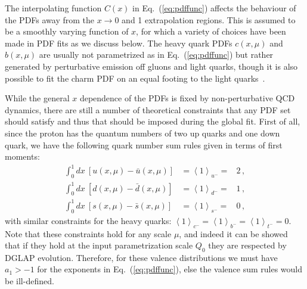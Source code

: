 The interpolating function $C(x)$ in
Eq.~(\ref{eq:pdffunc})
affects the behaviour of the PDFs away from the $x\to 0$ and 1
extrapolation regions.
%
This is assumed to be a smoothly varying function of $x$, for which a variety of choices have been made in PDF fits as we discuss below.
%
The heavy quark PDFs $c(x,\mu)$ and $b(x,\mu)$ are usually not
parametrized as in  Eq.~(\ref{eq:pdffunc}) but rather
generated by perturbative emission off gluons and light quarks,
though it is also possible to fit the charm PDF on an equal footing
to the light quarks~\cite{Ball:2016neh}.

While the general $x$ dependence of the PDFs is fixed by
non-perturbative QCD dynamics, there are still a number
of theoretical constraints that any PDF set should satisfy and thus that
should be imposed during the global fit.
%
First of all, since
the proton has the quantum numbers of two up quarks and one down quark,
we have the following quark number sum rules given in terms of first
moments: 
%
\begin{eqnarray}
\int_{0}^{1}dx\ \left[u(x,\mu)-\bar{u}(x,\mu)\right] & =\left\langle 1\right\rangle _{u^{-}}= & 2 \, ,\nonumber \\
\int_{0}^{1}dx\ \left[d(x,\mu)-\bar{d}(x,\mu)\right] & =\left\langle 1\right\rangle _{d^{-}}= & 1 \, ,\\
\int_{0}^{1}dx\ \left[s(x,\mu)-\bar{s}(x,\mu)\right] & =\left\langle 1\right\rangle _{s^{-}}= & 0 \, \nonumber ,
\end{eqnarray}
with similar constraints for the heavy quarks: $\left\langle 1\right\rangle _{c^{-}}=\left\langle 1\right\rangle _{b^{-}}=\left\langle 1\right\rangle _{t^{-}}=0$.
%
Note that these constraints hold for any scale $\mu$, and indeed it can be showed
that if they hold at the input parametrization scale $Q_0$ they
are respected by DGLAP evolution.
%
Therefore, for these valence distributions we must have $a_1>-1$ for the exponents in
Eq.~(\ref{eq:pdffunc}), else the valence sum rules would be ill-defined.

